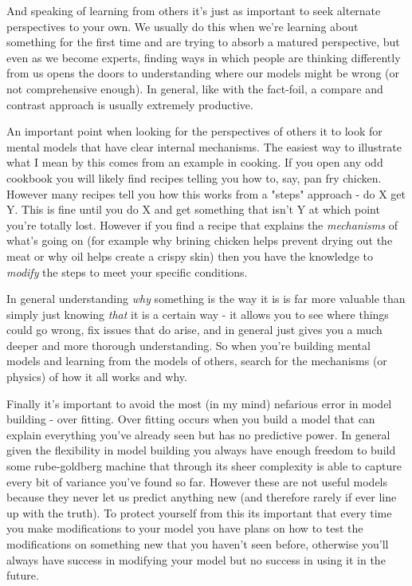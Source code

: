 \documentclass[11pt]{book}
\begin{document}
And speaking of learning from others it's just as important to seek alternate perspectives to your own. We usually do this when we're learning about something for the first time and are trying to absorb a matured perspective, but even as we become experts, finding ways in which people are thinking differently from us opens the doors to understanding where our models might be wrong (or not comprehensive enough). In general, like with the fact-foil, a compare and contrast approach is usually extremely productive.
\newline

An important point when looking for the perspectives of others it to look for mental models that have clear internal mechanisms. The easiest way to illustrate what I mean by this comes from an example in cooking. If you open any odd cookbook you will likely find recipes telling you how to, say, pan fry chicken. However many recipes tell you how this works from a "steps" approach - do X get Y. This is fine until you do X and get something that isn't Y at which point you're totally lost. However if you find a recipe that explains the \textit{mechanisms} of what's going on (for example why brining chicken helps prevent drying out the meat or why oil helps create a crispy skin) then you have the knowledge to \textit{modify} the steps to meet your specific conditions. 
\newline

In general understanding \textit{why} something is the way it is is far more valuable than simply just knowing \textit{that} it is a certain way - it allows you to see where things could go wrong, fix issues that do arise, and in general just gives you a much deeper and more thorough understanding. So when you're building mental models and learning from the models of others, search for the mechanisms (or physics) of how it all works and why.
\newline

Finally it's important to avoid the most (in my mind) nefarious error in model building - over fitting. Over fitting occurs when you build a model that can explain everything you've already seen but has no predictive power. In general given the flexibility in model building you always have enough freedom to build some rube-goldberg machine that through its sheer complexity is able to capture every bit of variance you've found so far. However these are not useful models because they never let us predict anything new (and therefore rarely if ever line up with the truth). To protect yourself from this its important that every time you make modifications to your model you have plans on how to test the modifications on something new that you haven't seen before, otherwise you'll always have success in modifying your model but no success in using it in the future. 
\newline
\end{document}
